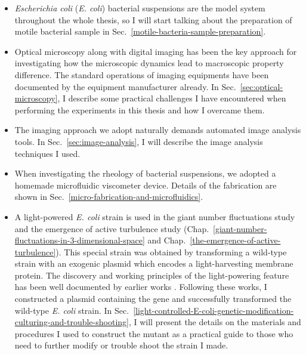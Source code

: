 \begin{itemize}
\item \textit{Escherichia coli} (\textit{E. coli}) bacterial suspensions are the model system throughout the whole thesis, so I will start talking about the preparation of motile bacterial sample in Sec.~\ref{motile-bacteria-sample-preparation}.
\item Optical microscopy along with digital imaging has been the key approach for investigating how the microscopic dynamics lead to macroscopic property difference. The standard operations of imaging equipments have been documented by the equipment manufacturer already. In Sec.~\ref{sec:optical-microscopy}, I describe some practical challenges I have encountered when performing the experiments in this thesis and how I overcame them.
\item The imaging approach we adopt naturally demands automated image analysis tools. In Sec.~\ref{sec:image-analysis}, I will describe the image analysis techniques I used.
\item When investigating the rheology of bacterial suspensions, we adopted a homemade microfluidic viscometer device. Details of the fabrication are shown in Sec.~\ref{micro-fabrication-and-microfluidics}.
\item A light-powered \textit{E. coli} strain is used in the giant number fluctuations study and the emergence of active turbulence study
(Chap.~\ref{giant-number-fluctuations-in-3-dimensional-space} and Chap.~\ref{the-emergence-of-active-turbulence}). This special strain was obtained by transforming a wild-type strain with an exogenic plasmid which encodes a light-harvesting membrane protein. The discovery and working principles of the light-powering feature has been well documented by earlier works
\cite{Beja2000, Subramaniam2000, DelaTorre2003, Walter2007, Claassens2013}. Following these works, I constructed a plasmid containing the gene and successfully transformed the wild-type \textit{E. coli} strain.
In Sec.~\ref{light-controlled-E-coli-genetic-modification-culturing-and-trouble-shooting}, I will present the details on the materials and procedures I used to construct the mutant as a practical guide to those who need to further modify or trouble shoot the strain I made.
\end{itemize}

